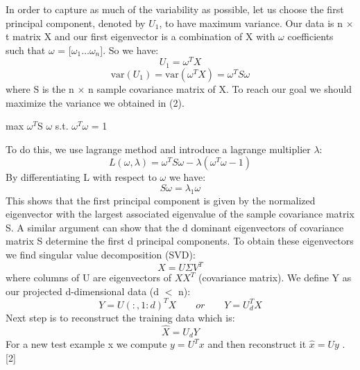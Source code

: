 \documentclass[a4paper]{article}
\begin{document}
In order to capture as much of the variability as possible, let us choose the first principal component, denoted by $U_1$, to have maximum variance. Our data is n $\times$ t matrix X and our first eigenvector is a combination of X with $\omega$ coefficients such that $\omega$ = [$\omega_1 \ldots \omega_n$]. So we have:
\begin{equation}
U_1 = \omega^T X 
\end{equation}
\begin{equation}
\text{var}(U_1) = \text{var}(\omega^T X) = \omega^T S \omega
\end{equation}
where S is the n $\times$ n sample covariance matrix of X. 
To reach our goal we should maximize the variance we obtained in (2).
\begin{center}  
max  $\omega^T$S $\omega$ \space \space s.t. $\omega^T \omega$ = 1 
\end{center}
To do this, we use lagrange method and introduce a lagrange multiplier $\lambda$:
\begin{equation}
L(\omega, \lambda) = \omega^T S \omega - \lambda(\omega^T \omega - 1)
\end{equation}
By differentiating L with respect to $\omega$ we have:
\begin{equation}
S\omega = \lambda_1\omega
\end{equation}
This shows that the first principal component is given by the normalized eigenvector with the largest associated eigenvalue of the sample covariance matrix S. A similar argument can show that the d dominant eigenvectors of covariance matrix S determine the first d principal components. To obtain these eigenvectors we find singular value decomposition (SVD):
\begin{equation}
X = U \Sigma V^T
\end{equation}
where columns of U are eigenvectors of $XX^T$ (covariance matrix).
We define Y as our projected d-dimensional data (d $<$ n):
\begin{equation}
Y = U(:, 1:d)^T X \qquad or \qquad Y = U_d^T X
\end{equation}
Next step is to reconstruct the training data which is:
\begin{equation}
\hat{X} = U_d Y
\end{equation}
For a new test example x we compute $y = U^T x$ and then reconstruct it $\hat{x} = U y$ .
[2]
\end{document}
